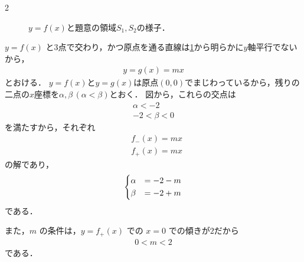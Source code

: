 \documentclass[../../main.tex]{subfiles}
\begin{document}
\begin{multicols}{2}
\begin{figure}[H]
    \caption{$y=f(x)$と題意の領域$S_1,S_2$の様子．}
    \label{1999-1:fig:1}
  \end{figure}

  $y=f(x)$ と3点で交わり，かつ原点を通る直線は\cref{1999-1:fig:1}から明らかに$y$軸平行でないから，
  \begin{align}
    y=g(x) = mx
  \end{align}
  とおける．
  $y=f(x)$と$y=g(x)$は原点$(0,0)$でまじわっているから，残りの二点の$x$座標を$\alpha,\beta\, (\alpha<\beta)$とおく．
  図から，これらの交点は
  \begin{align}
    \alpha < -2 \\
    -2 < \beta < 0
  \end{align}
  を満たすから，それぞれ
  \begin{align}
    & f_{-}(x) = mx \\
    & f_{+}(x) = mx
  \end{align}
  の解であり，
  \begin{align}
    \begin{dcases}
      \alpha & = -2 -m \\
      \beta  & = -2 +m
    \end{dcases} \label{eq:1}
  \end{align}
  である．

  また，$m$ の条件は，$y=f_{+}(x)$ での $x=0$ での傾きが$2$だから
  \begin{align}
    0   < m < 2 \label{eq:2}
  \end{align}
  である．


\end{multicols}
\end{document}
